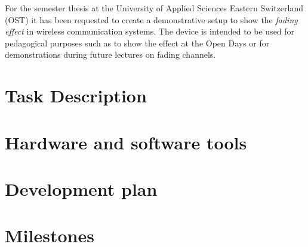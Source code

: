 \documentclass[a4paper, twosided, 11pt]{scrartcl}
\begin{document}
For the semester thesis at the University of Applied Sciences Eastern Switzerland (OST) it has been requested to create a demonstrative setup to show the \emph{fading effect} in wireless communication systems.
The device is intended to be used for pedagogical purposes such as to show the effect at the Open Days or for demonstrations during future lectures on fading channels.

\section{Task Description}


\section{Hardware and software tools}

\section{Development plan}

\section{Milestones}




\clearpage
{} 
\end{document}
